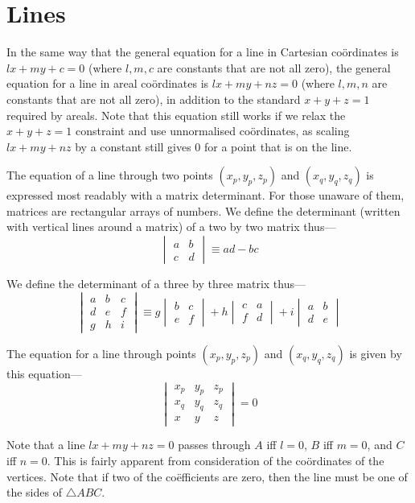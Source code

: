 \section{Lines}
\begin{multicols}{2}
In the same way that the general equation for a line in Cartesian co\"ordinates is \(lx+my+c=0\) (where \(l,m,c\) are constants that are not all zero), the general equation for a line in areal co\"ordinates is \(lx+my+nz=0\) (where \(l,m,n\) are constants that are not all zero), in addition to the standard \(x+y+z=1\) required by areals. Note that this equation still works if we relax the \(x+y+z=1\) constraint and use unnormalised co\"ordinates, as scaling \(lx+my+nz\) by a constant still gives 0 for a point that is on the line.

The equation of a line through two points \((x_p,y_p,z_p)\) and \((x_q,y_q,z_q)\) is expressed most readably with a matrix determinant. For those unaware of them, matrices are rectangular arrays of numbers. We define the determinant (written with vertical lines around a matrix) of a two by two matrix thus---
\[\begin{vmatrix}a&b\\c&d\end{vmatrix}\equiv{}ad-bc\]

We define the determinant of a three by three matrix thus---
\[\begin{vmatrix}a&b&c\\d&e&f\\g&h&i\end{vmatrix}\equiv{}g\begin{vmatrix}b&c\\e&f\end{vmatrix}+h\begin{vmatrix}c&a\\f&d\end{vmatrix}+i\begin{vmatrix}a&b\\d&e\end{vmatrix}\]

The equation for a line through points \((x_p,y_p,z_p)\) and \((x_q,y_q,z_q)\) is given by this equation---
\[\begin{vmatrix}x_p&y_p&z_p\\x_q&y_q&z_q\\x&y&z\end{vmatrix}=0\]

Note that a line \(lx+my+nz=0\) passes through \(A\) iff \(l=0\), \(B\) iff \(m=0\), and \(C\) iff \(n=0\). This is fairly apparent from consideration of the co\"ordinates of the vertices. Note that if two of the co\"efficients are zero, then the line must be one of the sides of \(\triangle{}ABC\). 
\end{multicols}
\clearpage
